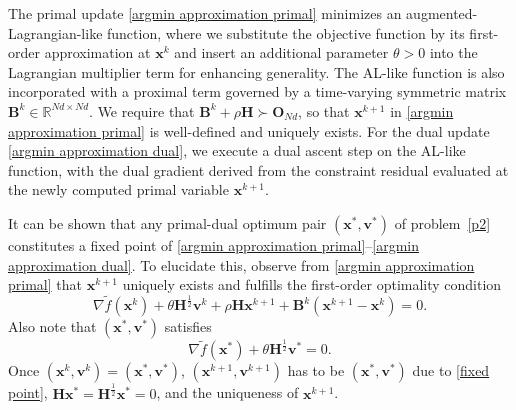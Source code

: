 \documentclass[12pt,draftcls,onecolumn]{IEEEtran}
\newcommand{\bx}{{\mathbf{x}}}
\newcommand{\bH}{{\mathbf{H}}}
\begin{document}
The primal update \eqref{argmin approximation primal} minimizes an augmented-Lagrangian-like function, where we substitute the objective function by its first-order approximation at $\bx^k$ and insert an additional parameter $\theta>0$ into the Lagrangian multiplier term for enhancing generality. The AL-like function is also incorporated with a proximal term governed by a time-varying symmetric matrix $\mathbf{B}^k\in \mathbb{R}^{Nd \times Nd}$. We require that $\mathbf{B}^k + \rho \mathbf{H} \succ \mathbf{O}_{Nd}$, so that $\mathbf{x}^{k+1}$ in \eqref{argmin approximation primal} is well-defined and uniquely exists. For the dual update \eqref{argmin approximation dual}, we execute a dual ascent step on the AL-like function, with the dual gradient derived from the constraint residual evaluated at the newly computed primal variable $\bx^{k+1}$.

It can be shown that any primal-dual optimum pair $(\mathbf{x}^*,\mathbf{v}^*)$ of problem~\eqref{p2} constitutes a fixed point of \eqref{argmin approximation primal}--\eqref{argmin approximation dual}. To elucidate this, observe from \eqref{argmin approximation primal} that $\mathbf{x}^{k+1}$ uniquely exists and fulfills the first-order optimality condition
\begin{equation}
\label{first-order opt} \nabla \tilde{f}(\mathbf{x}^k) + \theta\bH^{\frac{1}{2}} \mathbf{v}^k + \rho \mathbf{H} \mathbf{x}^{k+1}+ \mathbf{B}^k(\mathbf{x}^{k+1} - \mathbf{x}^k)=0.
\end{equation}
Also note that $(\mathbf{x}^*,\mathbf{v}^*)$ satisfies
\begin{equation}
\nabla \tilde{f}(\mathbf{x}^*)+ \theta\bH^{\frac{1}{2}} \mathbf{v}^*=0. \label{fixed point}
\end{equation}
Once $(\mathbf{x}^k,\mathbf{v}^k) = (\mathbf{x}^*,\mathbf{v}^*)$, $(\mathbf{x}^{k+1},\mathbf{v}^{k+1})$ has to be $(\mathbf{x}^*,\mathbf{v}^*)$ due to \eqref{fixed point}, $\mathbf{H}\mathbf{x}^*=\bH^{\frac{1}{2}}\mathbf{x}^*=0$, and the uniqueness of $\mathbf{x}^{k+1}$.
\end{document}
